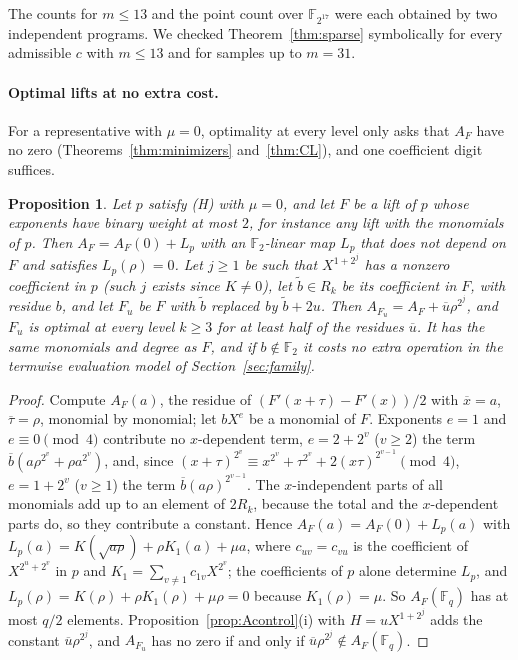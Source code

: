 \documentclass[11pt]{article}
\newtheorem{proposition}[theorem]{Proposition}
\theoremstyle{definition}
\theoremstyle{remark}
\newcommand{\F}{\mathbb{F}}
\newcommand{\ol}[1]{\overline{#1}}
\begin{document}
The counts for $m\le13$ and the point count over $\F_{2^{17}}$ were each obtained by two independent programs. We
checked Theorem~\ref{thm:sparse} symbolically for every admissible $c$ with $m\le13$ and for samples up to $m=31$.

\paragraph{Optimal lifts at no extra cost.}
For a representative with $\mu=0$, optimality at every level only asks that $A_F$ have no zero
(Theorems~\ref{thm:minimizers} and~\ref{thm:CL}), and one coefficient digit suffices.

\begin{proposition}\label{prop:lowcost}
Let $p$ satisfy (H) with $\mu=0$, and let $F$ be a lift of $p$ whose exponents have binary weight at most $2$, for
instance any lift with the monomials of $p$. Then $A_F=A_F(0)+L_p$ with an $\F_2$-linear map $L_p$ that does not depend on $F$ and
satisfies $L_p(\rho)=0$. Let $j\ge1$ be such that $X^{1+2^j}$ has a nonzero coefficient in $p$ (such $j$ exists since $K\ne0$), let
$\tilde b\in R_k$ be its coefficient in $F$, with residue $b$, and let $F_u$ be $F$ with $\tilde b$ replaced by $\tilde b+2u$. Then $A_{F_u}=A_F+\ol u\rho^{2^j}$, and $F_u$ is optimal at every level $k\ge3$ for at least half of
the residues $\ol u$. It has the same monomials and degree as $F$, and if $b\notin\F_2$ it costs no extra operation in the termwise
evaluation model of Section~\ref{sec:family}.
\end{proposition}
\begin{proof}
Compute $A_F(a)$, the residue of $(F'(x+\tau)-F'(x))/2$ with $\ol x=a$, $\ol\tau=\rho$, monomial by monomial; let $bX^e$ be a monomial of $F$. Exponents
$e=1$ and $e\equiv0\pmod 4$ contribute no $x$-dependent term, $e=2+2^v$ ($v\ge2$) the term
$\ol b(a\rho^{2^v}+\rho a^{2^v})$, and, since $(x+\tau)^{2^v}\equiv
x^{2^v}+\tau^{2^v}+2(x\tau)^{2^{v-1}}\pmod4$, $e=1+2^v$ ($v\ge1$) the term $\ol b(a\rho)^{2^{v-1}}$. The
$x$-independent parts of all monomials add up to an element of $2R_k$, because the total and the $x$-dependent parts
do, so they contribute a constant. Hence
$A_F(a)=A_F(0)+L_p(a)$ with $L_p(a)=K(\sqrt{a\rho})+\rho K_1(a)+\mu a$, where $c_{uv}=c_{vu}$ is the coefficient of $X^{2^u+2^v}$ in $p$ and $K_1=\sum_{v\ne1}c_{1v}X^{2^v}$; the
coefficients of $p$ alone determine $L_p$, and $L_p(\rho)=K(\rho)+\rho K_1(\rho)+\mu\rho=0$ because $K_1(\rho)=\mu$. So
$A_F(\F_q)$ has at most $q/2$ elements. Proposition~\ref{prop:Acontrol}(i) with $H=uX^{1+2^j}$ adds the constant
$\ol u\rho^{2^j}$, and $A_{F_u}$ has no zero if and only if $\ol u\rho^{2^j}\notin A_F(\F_q)$.
\end{proof}
\end{document}
